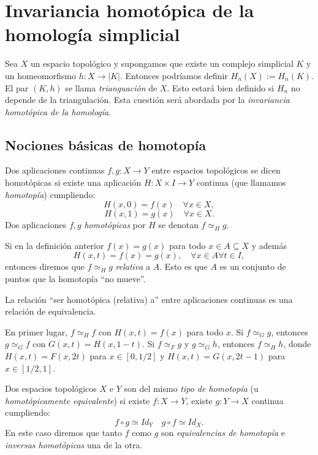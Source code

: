 \documentclass[HS.tex]{subfiles}
\begin{document}
\chapter{Invariancia homotópica de la homología simplicial}


Sea $X$ un espacio topológico y supongamos que existe un complejo simplicial $K$ y un homeomorfismo $h \colon X \to |K|$.
Entonces podríamos definir $H_n(X) := H_n(K)$.
El par $(K,h)$ se llama \emph{trianguación} de $X$.
Esto estará bien definido si $H_n$ no depende de la triangulación.
Esta cuestión será abordada por la \emph{invariancia homotópica de la homología}.

\section{Nociones básicas de homotopía}

\begin{defi}\label{homotopia}
Dos aplicaciones continuas $f,g \colon X \to Y$ entre espacios topológicos se dicen homotópicas si existe una aplicación $H \colon X \times I \to Y$ continua (que llamamos \emph{homotopía}) cumpliendo:
\[ H(x,0) = f(x) \quad \forall x \in X, \]
\[ H(x,1) = g(x) \quad \forall x \in X. \]
Dos aplicaciones $f,g$ \emph{homotópicas} por $H$ se denotan $f \simeq_H g$. 
\end{defi}

\begin{defi}
Si en la definición anterior $f(x) = g(x)$ para todo $x \in A \subseteq X$ y además
\[ H(x,t) = f(x) = g(x),\quad \forall x \in A \forall t \in I, \]
entonces diremos que $f \simeq_H g$ \emph{relativa} a $A$.
Esto es que $A$ es un conjunto de puntos que la homotopía ``no mueve''.
\end{defi}

\begin{prop}
La relación ``ser homotópica (relativa) a'' entre aplicaciones continuas es una relación de equivalencia.
\end{prop}
\begin{dem}
En primer lugar, $f\simeq_H f$ con $H(x,t)=f(x)$ para todo $x$. Si $f\simeq_G g$, entonces $g\simeq_G f$ con $G(x,t)=H(x,1-t)$. Si $f\simeq_F g$ y $g\simeq_G h$, entonces $f\simeq_H h$, donde $H(x,t)=F(x,2t)$ para  $x\in [0,1/2]$ y $H(x,t)=G(x,2t-1)$ para $x\in [1/2,1]$.\QED
\end{dem}

\begin{defi}
Dos espacios topológicos $X$ e $Y$ son del mismo \emph{tipo de homotopía} (u \emph{homotópicamente equivalente}) si existe $f \colon X \to Y$, existe $g \colon Y \to X$ continua cumpliendo:
\[ f \circ g \simeq Id_Y \quad g \circ f \simeq Id_X. \]
En este caso diremos que tanto $f$ como $g$ son \emph{equivalencias de homotopía} e \emph{inversas homotópicas} una de la otra.
\end{defi}
\end{document}
